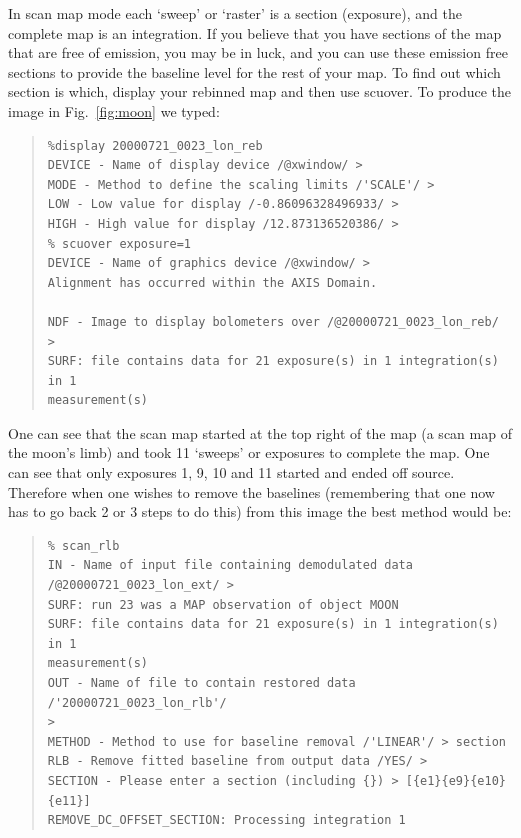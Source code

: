 \documentclass[twoside,11pt]{article}
\newenvironment{myquote}{\begin{quote}\begin{small}}{\end{small}\end{quote}}
\newcommand{\task}[1]{\textsf{#1}}
\newcommand{\scuover}{\xref{\task{scuover}}{sun216}{SCUOVER}}
\newcommand{\xref}[3]{#1}
\renewcommand{\_}{\texttt{\symbol{95}}}
\begin{document}
In scan map mode each `sweep' or `raster' is a section (exposure), and
the complete map is an integration. If you believe that you have
sections of the map that are free of emission, you may be in luck, and
you can use these emission free sections to provide the baseline level
for the rest of your map. To find out which section is which, display
your rebinned map and then use \scuover. To produce the image in Fig.\
\ref{fig:moon} we typed:

\begin{myquote}
\begin{verbatim}
%display 20000721_0023_lon_reb
DEVICE - Name of display device /@xwindow/ >
MODE - Method to define the scaling limits /'SCALE'/ >
LOW - Low value for display /-0.86096328496933/ >
HIGH - High value for display /12.873136520386/ >
% scuover exposure=1
DEVICE - Name of graphics device /@xwindow/ >
Alignment has occurred within the AXIS Domain.

NDF - Image to display bolometers over /@20000721_0023_lon_reb/ >
SURF: file contains data for 21 exposure(s) in 1 integration(s) in 1
measurement(s)
\end{verbatim}
\end{myquote}

One can see that the scan map started at the top right of the map (a
scan map of the moon's limb) and took 11 `sweeps' or exposures to
complete the map.  One can see that only exposures 1, 9, 10 and 11
started and ended off source.  Therefore when one wishes to remove the
baselines (remembering that one now has to go back 2 or 3 steps to do
this) from this image the best method would be:

\begin{myquote}
\begin{verbatim}
% scan_rlb
IN - Name of input file containing demodulated data
/@20000721_0023_lon_ext/ >
SURF: run 23 was a MAP observation of object MOON
SURF: file contains data for 21 exposure(s) in 1 integration(s) in 1
measurement(s)
OUT - Name of file to contain restored data /'20000721_0023_lon_rlb'/
>
METHOD - Method to use for baseline removal /'LINEAR'/ > section
RLB - Remove fitted baseline from output data /YES/ >
SECTION - Please enter a section (including {}) > [{e1}{e9}{e10}{e11}]
REMOVE_DC_OFFSET_SECTION: Processing integration 1
\end{verbatim}
\end{myquote}
\end{document}
